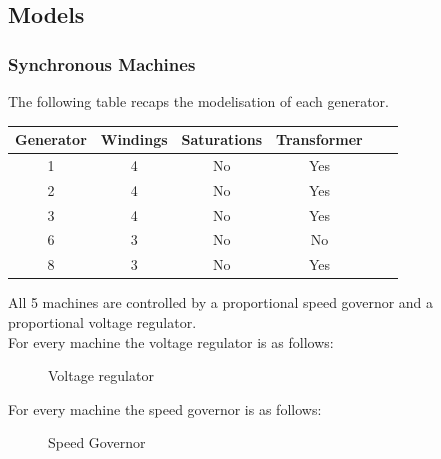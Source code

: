 \documentclass[a4paper, 12pt]{report}
\begin{document}
\subsection{Models}

\subsubsection{Synchronous Machines}

The following table recaps the modelisation of each generator.

\begin{center}
\begin{tabular}{|c|c|c|c|c|c|}
  \hline
  Generator & Windings  & Saturations & Transformer\\
  \hline
  1 & 4 & No & Yes\\
  2 & 4 & No & Yes\\
  3 & 4 & No & Yes\\
  6 & 3 & No & No\\
  8 & 3 & No & Yes\\
  \hline
\end{tabular}
\end{center}

All 5 machines are controlled by a proportional speed governor and a proportional voltage regulator. \\

For every machine the voltage regulator is as follows:
\begin{figure}[H]
\centering
{}
\caption{Voltage regulator}
\end{figure}

For every machine the speed governor is as follows:
\begin{figure}[H]
\centering
{}
\caption{Speed Governor}
\end{figure}
\end{document}
